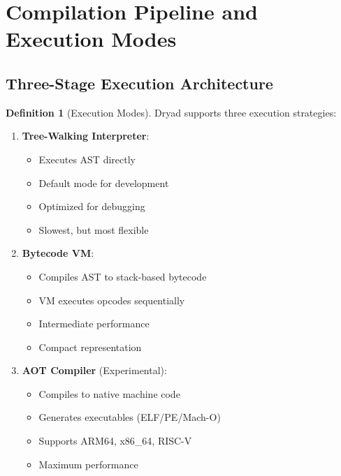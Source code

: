\documentclass[12pt,a4paper]{article}
\theoremstyle{definition}
\newtheorem{definition}{Definition}[section]
\begin{document}
\newpage

\section{Compilation Pipeline and Execution Modes}

\subsection{Three-Stage Execution Architecture}

\begin{definition}[Execution Modes]
Dryad supports three execution strategies:

\begin{enumerate}[leftmargin=*]
    \item \textbf{Tree-Walking Interpreter}:
    \begin{itemize}[noitemsep]
        \item Executes AST directly
        \item Default mode for development
        \item Optimized for debugging
        \item Slowest, but most flexible
    \end{itemize}
    
    \item \textbf{Bytecode VM}:
    \begin{itemize}[noitemsep]
        \item Compiles AST to stack-based bytecode
        \item VM executes opcodes sequentially
        \item Intermediate performance
        \item Compact representation
    \end{itemize}
    
    \item \textbf{AOT Compiler} (Experimental):
    \begin{itemize}[noitemsep]
        \item Compiles to native machine code
        \item Generates executables (ELF/PE/Mach-O)
        \item Supports ARM64, x86\_64, RISC-V
        \item Maximum performance
    \end{itemize}
\end{enumerate}
\end{definition}
\end{document}
